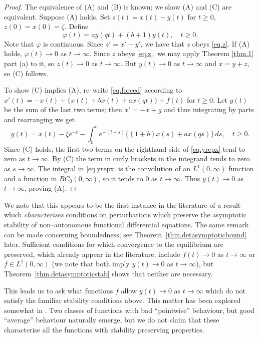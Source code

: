 \documentclass[a4paper,10pt,reqno]{amsart}
\numberwithin{equation}{section}
\theoremstyle{definition}
\theoremstyle{remark}
\DeclareMathOperator{\1}{\mathbbm 1}
\begin{document}
	\begin{proof}
		The equivalence of (A) and (B) is known; we show (A) and (C) are equivalent.
		Suppose (A) holds. Set $z(t)=x(t)-y(t)$ for $t\geq 0$, $z(0)=x(0)=\zeta$. Define 
		\begin{equation} \label{def.varphi1}
			\varphi(t)=ay(qt)+(b+1)y(t), \quad t\geq 0. 
		\end{equation}
		Note that $\varphi$ is continuous. Since $z'=x'-y'$, we have that $z$ obeys \eqref{eq.z}. 
		If (A) holds, $\varphi(t)\to 0$ as $t\to\infty$. Since $z$ obeys \eqref{eq.z}, we may apply Theorem \ref{thm.1} part (a) to it, so $z(t)\to 0$ as $t\to\infty$. But $y(t)\to 0$ as $t\to\infty$ and $x=y+z$, so (C) follows. 
		
		To show (C) implies (A), re--write \eqref{eq.forced} according to  
		$x'(t) = -x(t) + \{x(t)+bx(t)+ax(qt)\} + f(t)$ for $t\geq 0$. Let $g(t)$ be the sum of the last two terms; then $x'=-x+g$ and thus integrating by parts and rearranging we get 
		\begin{equation} \label{eq.yrepx}
			y(t)=x(t)-\xi e^{-t} - \int_0^t e^{-(t-s)} \{(1+b)x(s)+ax(qs)\}\,ds, \quad t\geq 0.
		\end{equation}
		Since (C) holds, the first two terms on the righthand side of \eqref{eq.yrepx} tend to zero as $t\to\infty$. By (C) the term in curly brackets in the integrand tends to zero as $s\to\infty$. The integral in \eqref{eq.yrepx} is  the convolution of an $L^1(0,\infty)$ function and a function in $BC_0(0,\infty)$, so it tends to $0$ as $t\to\infty$. Thus $y(t)\to 0$ as $t\to\infty$, proving (A).    
	\end{proof}
	We note that this appears to be the first instance in the literature of a result which \textit{characterises} conditions on perturbations which preserve the asymptotic stability of non--autonomous functional differential equations. The same remark can be made concerning boundedness; see Theorem~\ref{thm.detasymptoticbound} later. Sufficient conditions for which convergence  to the equilibrium are preserved, which already appear in the literature, include $f(t)\to 0$ as $t\to\infty$ or $f\in L^1(0,\infty)$ (we note that both imply $y(t)\to 0$ as $t\to\infty$), but Theorem~\ref{thm.detasymptoticstab} shows that neither are necessary. 
	
	This leads us to ask what functions $f$ allow $y(t)\to 0$ as $t\to\infty$ which do not satisfy the familiar stability conditions above. This matter has been explored somewhat in \cite{AL:2023(AppliedNumMath)}. Two classes of functions with bad ``pointwise'' behaviour, but good ``average'' behaviour naturally emerge, but we do not claim that these characterise all the functions with stability preserving properties. 
	
\end{document}
